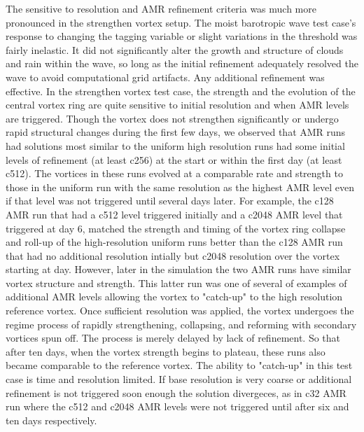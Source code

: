 The sensitive to resolution and AMR refinement criteria was much
more pronounced in the strengthen vortex setup.
The moist barotropic wave test case's response to changing the tagging 
variable or slight variations in the threshold was fairly inelastic. It
did not significantly alter the growth and structure of clouds and rain within the wave,
so long as the initial refinement adequately resolved the wave to avoid
computational grid artifacts. Any additional refinement was effective.
In the strengthen vortex test case, the strength and the evolution 
of the central vortex ring are quite sensitive to initial resolution and when 
AMR levels are triggered. Though the vortex does not strengthen 
significantly or undergo rapid structural changes during the first few days, 
we observed that AMR runs had solutions most similar to the uniform high
resolution runs had some initial levels of refinement (at least c256) at the start or within
the first day (at least c512). The vortices in these runs evolved at a comparable rate
and strength to those in the uniform run with the same resolution
as the highest AMR level even if that level was not triggered until several days later.
For example, the c128 AMR run that had a c512 level triggered initially and a c2048 AMR level 
that triggered at day 6, matched the strength and timing of the vortex ring 
collapse and roll-up of the high-resolution uniform runs better than the
c128 AMR run that had no additional resolution intially but
c2048 resolution over the vortex starting at day. However, later in the
simulation the two AMR runs have similar vortex structure and strength.
This latter run was one of several of examples of additional AMR levels
allowing the vortex to "catch-up" to the high resolution reference vortex. 
Once sufficient resolution was applied, the vortex undergoes the regime process of 
rapidly strengthening, collapsing, and reforming with secondary vortices spun off. 
The process is merely delayed by lack of refinement. So that after ten days, when the
vortex strength begins to plateau, these runs also became comparable to
the reference vortex. The ability to "catch-up" in this 
test case is time and resolution limited. If base resolution is very coarse
or additional refinement is not triggered soon enough the solution divergeces,  
as in c32 AMR run where the c512 and c2048
AMR levels were not triggered until after six and ten days respectively.

